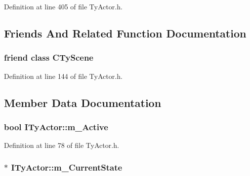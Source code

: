 Definition at line 405 of file TyActor.h.



\subsection{Friends And Related Function Documentation}
\hypertarget{class_i_ty_actor_ac9e603148a462b197c336bd2dedd9f87}{
\subsubsection[{CTyScene}]{\setlength{\rightskip}{0pt plus 5cm}friend class {\bf CTyScene}}}
\label{class_i_ty_actor_ac9e603148a462b197c336bd2dedd9f87}


Definition at line 144 of file TyActor.h.



\subsection{Member Data Documentation}
\hypertarget{class_i_ty_actor_ae460cd48bef240e11cfa5df7a505cbe9}{
\subsubsection[{m\_\-Active}]{\setlength{\rightskip}{0pt plus 5cm}bool {\bf ITyActor::m\_\-Active}}}
\label{class_i_ty_actor_ae460cd48bef240e11cfa5df7a505cbe9}


Definition at line 78 of file TyActor.h.

\hypertarget{class_i_ty_actor_afcdb5a06ae0e2b6d9872fa6f17222487}{
\subsubsection[{m\_\-CurrentState}]{$\ast$ {\bf ITyActor::m\_\-CurrentState}}}
\label{class_i_ty_actor_afcdb5a06ae0e2b6d9872fa6f17222487}


